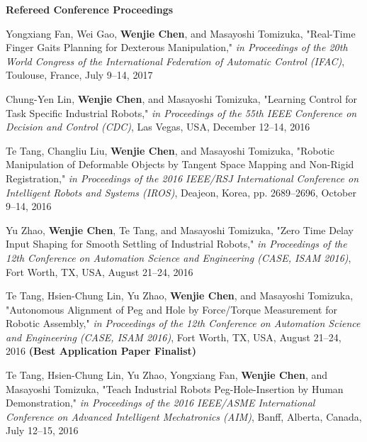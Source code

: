\documentclass[UTF8,nofonts]{res}
\begin{document}
\begin{resume}
    \textbf{Refereed Conference Proceedings} %
    \begin{etaremune}[start=26]
    \item Yongxiang Fan, Wei Gao, \textbf{Wenjie Chen}, and Masayoshi Tomizuka, "Real-Time Finger Gaits Planning for Dexterous Manipulation," \emph{in Proceedings of the 20th World Congress of the International Federation of Automatic Control (IFAC)}, Toulouse, France, July 9--14, 2017
    \item Chung-Yen Lin, \textbf{Wenjie Chen}, and Masayoshi Tomizuka, "Learning Control for Task Specific Industrial Robots," \emph{in Proceedings of the 55th IEEE Conference on Decision and Control (CDC)}, Las Vegas, USA, December 12--14, 2016
	\item Te Tang, Changliu Liu, \textbf{Wenjie Chen}, and Masayoshi Tomizuka, "Robotic Manipulation of Deformable Objects by Tangent Space Mapping and Non-Rigid Registration," \emph{in Proceedings of the 2016 IEEE/RSJ International Conference on Intelligent Robots and Systems (IROS)}, Deajeon, Korea, pp. 2689--2696, October 9--14, 2016
	\item Yu Zhao, \textbf{Wenjie Chen}, Te Tang, and Masayoshi Tomizuka, "Zero Time Delay Input Shaping for Smooth Settling of Industrial Robots," \emph{in Proceedings of the 12th Conference on Automation Science and Engineering (CASE, ISAM 2016)}, Fort Worth, TX, USA, August 21--24, 2016
	\item Te Tang, Hsien-Chung Lin, Yu Zhao, \textbf{Wenjie Chen}, and Masayoshi Tomizuka, "Autonomous Alignment of Peg and Hole by Force/Torque Measurement for Robotic Assembly," \emph{in Proceedings of the 12th Conference on Automation Science and Engineering (CASE, ISAM 2016)}, Fort Worth, TX, USA, August 21--24, 2016 \textbf{(Best Application Paper Finalist)}
	\item Te Tang, Hsien-Chung Lin, Yu Zhao, Yongxiang Fan, \textbf{Wenjie Chen}, and Masayoshi Tomizuka, "Teach Industrial Robots Peg-Hole-Insertion by Human Demonstration," \emph{in Proceedings of the 2016 IEEE/ASME International Conference on Advanced Intelligent Mechatronics (AIM)}, Banff, Alberta, Canada, July 12--15, 2016

\end{etaremune}
\end{resume}
\end{document}
